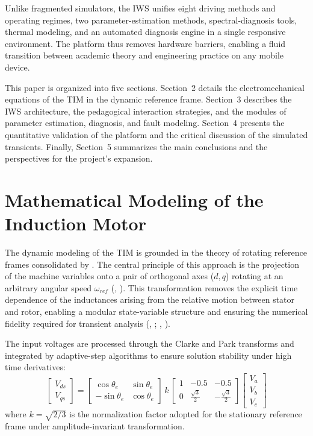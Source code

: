 \documentclass[a4paper]{ifacconf}
\begin{document}
Unlike fragmented simulators, the IWS unifies eight driving methods and operating regimes, two parameter-estimation methods, spectral-diagnosis tools, thermal modeling, and an automated diagnosis engine in a single responsive environment. The platform thus removes hardware barriers, enabling a fluid transition between academic theory and engineering practice on any mobile device.

This paper is organized into five sections. Section~2 details the electromechanical equations of the TIM in the dynamic reference frame. Section~3 describes the IWS architecture, the pedagogical interaction strategies, and the modules of parameter estimation, diagnosis, and fault modeling. Section~4 presents the quantitative validation of the platform and the critical discussion of the simulated transients. Finally, Section~5 summarizes the main conclusions and the perspectives for the project's expansion.

\section{Mathematical Modeling of the Induction Motor}
\label{sec:modelagem}

The dynamic modeling of the TIM is grounded in the theory of rotating reference frames consolidated by \cite{KrauseThomas}. The central principle of this approach is the projection of the machine variables onto a pair of orthogonal axes ($d, q$) rotating at an arbitrary angular speed $\omega_{ref}$ (\citeauthor{usta2024mathematical}, \citeyear{usta2024mathematical}). This transformation removes the explicit time dependence of the inductances arising from the relative motion between stator and rotor, enabling a modular state-variable structure and ensuring the numerical fidelity required for transient analysis (\citeauthor{sengamalai2022three}, \citeyear{sengamalai2022three}; \citeauthor{leroux2022static}, \citeyear{leroux2022static}).

The input voltages are processed through the Clarke and Park transforms and integrated by adaptive-step algorithms to ensure solution stability under high time derivatives:
\begin{equation}
\label{eq:park_en}
\begin{bmatrix}V_{ds} \\ V_{qs}\end{bmatrix} = \begin{bmatrix}\cos\theta_e & \sin\theta_e \\ -\sin\theta_e & \cos\theta_e\end{bmatrix} \,k\, \begin{bmatrix}1 & -0.5 & -0.5 \\ 0 & \frac{\sqrt{3}}{2} & -\frac{\sqrt{3}}{2}\end{bmatrix} \begin{bmatrix}V_a \\ V_b \\ V_c\end{bmatrix}
\end{equation}
where $k = \sqrt{2/3}$ is the normalization factor adopted for the stationary reference frame under amplitude-invariant transformation.
\end{document}
